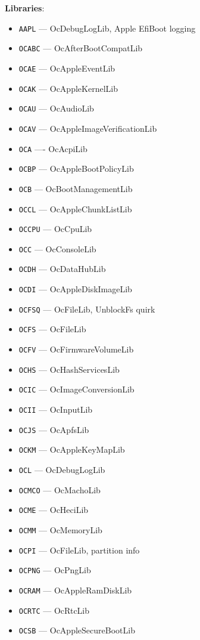 \documentclass[]{article}
\providecommand{\tightlist}{%
  \setlength{\itemsep}{0pt}\setlength{\parskip}{0pt}}
\begin{document}
\begin{enumerate}
  \textbf{Libraries}:
  \begin{itemize}
  \tightlist
  \item \texttt{AAPL} --- OcDebugLogLib, Apple EfiBoot logging
  \item \texttt{OCABC} --- OcAfterBootCompatLib
  \item \texttt{OCAE} --- OcAppleEventLib
  \item \texttt{OCAK} --- OcAppleKernelLib
  \item \texttt{OCAU} --- OcAudioLib
  \item \texttt{OCAV} --- OcAppleImageVerificationLib
  \item \texttt{OCA} ---- OcAcpiLib
  \item \texttt{OCBP} --- OcAppleBootPolicyLib
  \item \texttt{OCB} --- OcBootManagementLib
  \item \texttt{OCCL} --- OcAppleChunkListLib
  \item \texttt{OCCPU} --- OcCpuLib
  \item \texttt{OCC} --- OcConsoleLib
  \item \texttt{OCDH} --- OcDataHubLib
  \item \texttt{OCDI} --- OcAppleDiskImageLib
  \item \texttt{OCFSQ} --- OcFileLib, UnblockFs quirk
  \item \texttt{OCFS} --- OcFileLib
  \item \texttt{OCFV} --- OcFirmwareVolumeLib
  \item \texttt{OCHS} --- OcHashServicesLib
  \item \texttt{OCIC} --- OcImageConversionLib
  \item \texttt{OCII} --- OcInputLib
  \item \texttt{OCJS} --- OcApfsLib
  \item \texttt{OCKM} --- OcAppleKeyMapLib
  \item \texttt{OCL} --- OcDebugLogLib
  \item \texttt{OCMCO} --- OcMachoLib
  \item \texttt{OCME} --- OcHeciLib
  \item \texttt{OCMM} --- OcMemoryLib
  \item \texttt{OCPI} --- OcFileLib, partition info
  \item \texttt{OCPNG} --- OcPngLib
  \item \texttt{OCRAM} --- OcAppleRamDiskLib
  \item \texttt{OCRTC} --- OcRtcLib
  \item \texttt{OCSB} --- OcAppleSecureBootLib

\end{itemize}
\end{enumerate}
\end{document}
